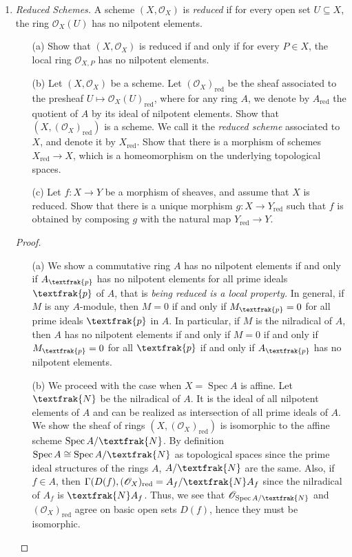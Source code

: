 \documentclass{article}
\newcommand{\goth}[1]{\textfrak{#1}}
\newcommand{\fO}{\mathscr{O}}
\DeclareMathOperator{\spec}{Spec}
\begin{document}
\begin{enumerate} [label=\textbf{\arabic*.}, leftmargin=0em]
\item \textit{Reduced Schemes.} A scheme $(X, \fO_X)$ is \textit{reduced} if for every open set $U \subseteq X$, the ring $\fO_X(U)$ has no nilpotent elements.
\begin{itemize}[leftmargin=0cm]
    \item[(a)] Show that $(X, \fO_X)$ is reduced if and only if for every $P \in X$, the local ring $\fO_{X, P}$ has no nilpotent elements.
    \item[(b)] Let $(X, \fO_X)$ be a scheme. Let $(\fO_X)_\text{red}$ be the sheaf associated to the presheaf $U \mapsto \fO_X(U)_\text{red}$, where for any ring $A$, we denote by $A_\text{red}$ the quotient of $A$ by its ideal of nilpotent elements. Show that $(X, (\fO_X)_\text{red})$ is a scheme. We call it the \textit{reduced scheme} associated to $X$, and denote it by $X_\text{red}$. Show that there is a morphism of schemes $X_\text{red} \to X$, which is a homeomorphism on the underlying topological spaces.
    \item[(c)] Let $f : X \to Y$ be a morphism of sheaves, and assume that $X$ is reduced. Show that there is a unique morphism $g : X \to Y_\text{red}$ such that $f$ is obtained by composing $g$ with the natural map $Y_\text{red} \to Y$.
\end{itemize}

\begin{proof} $ $ \vspace{0pt}
   \begin{itemize} [leftmargin=0cm]
    \item[(a)] We show a commutative ring $A$ has no nilpotent elements if and only if $A_\goth{p}$ has no nilpotent elements for all prime ideals $\goth{p}$ of $A$, that is \textit{being reduced is a local property.} In general, if $M$ is any $A$-module, then $M = 0$ if and only if $M_\goth{p} = 0$ for all prime ideals $\goth{p}$ in $A$. In particular, if $M$ is the nilradical of $A$, then $A$ has no nilpotent elements if and only if $M = 0$ if and only if $M_\goth{p} = 0$ for all $\goth{p}$ if and only if $A_\goth{p}$ has no nilpotent elements.

    \item[(b)] We proceed with the case when $X = \spec{A}$ is affine. Let $\goth{N}$ be the nilradical of $A$. It is the ideal of all nilpotent elements of $A$ and can be realized as intersection of all prime ideals of $A$. We show the sheaf of rings $(X, (\fO_X)_\text{red})$ is isomorphic to the affine scheme $\spec{A / \goth{N}}$. By definition $\spec{A} \cong \spec{A / \goth{N}}$ as topological spaces since the prime ideal structures of the rings $A$, $A / \goth{N}$ are the same. Also, if $f \in A$, then $\Gamma(D(f), (\fO_X)_\text{red} = A_f / \goth{N} A_f$ since the nilradical of $A_f$ is $\goth{N} A_f$. Thus, we see that $\fO_{\spec{A / \goth{N}}}$ and $(\fO_X)_\text{red}$ agree on basic open sets $D(f)$, hence they must be isomorphic.
    

\end{itemize}
\end{proof}
\end{enumerate}
\end{document}

